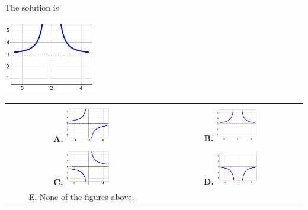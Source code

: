 \documentclass{article}[14pt]
\begin{document}
 
 The solution is  
 \begin{center} \includegraphics[width=0.3\textwidth]{../Figures/rationalEquationToGraphCB.png} \end{center}\begin{tabular}{|c|c|} 
\hline 
 & \tabularnewline 
 \textbf{A.} \includegraphics[width=0.3\textwidth]{../Figures/rationalEquationToGraphCA.png} & \textbf{B.} \includegraphics[width=0.3\textwidth]{../Figures/rationalEquationToGraphCB.png} \tabularnewline 
\hline 
 & \tabularnewline 
 \textbf{C.} \includegraphics[width=0.3\textwidth]{../Figures/rationalEquationToGraphCC.png} & \textbf{D.} \includegraphics[width=0.3\textwidth]{../Figures/rationalEquationToGraphCD.png} \tabularnewline 
\hline 
 E. None of the figures above. & \tabularnewline 
\hline 
 \end{tabular} 
 
\end{document}
